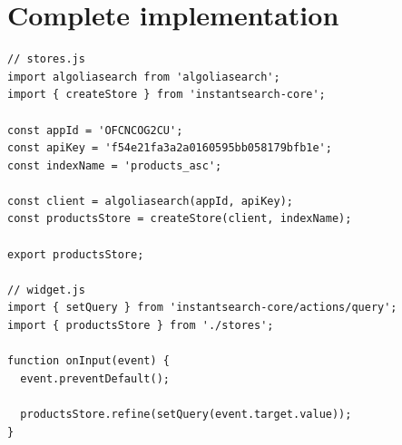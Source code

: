 
\section{Complete implementation} %
\label{sec:complete_implementation}


\begin{lstlisting}[caption={Using instantearch-core},label={lst:is-core-usage}]
// stores.js
import algoliasearch from 'algoliasearch';
import { createStore } from 'instantsearch-core';

const appId = 'OFCNCOG2CU';
const apiKey = 'f54e21fa3a2a0160595bb058179bfb1e';
const indexName = 'products_asc';

const client = algoliasearch(appId, apiKey);
const productsStore = createStore(client, indexName);

export productsStore;

// widget.js
import { setQuery } from 'instantsearch-core/actions/query';
import { productsStore } from './stores';

function onInput(event) {
  event.preventDefault();

  productsStore.refine(setQuery(event.target.value));
}
\end{lstlisting}


